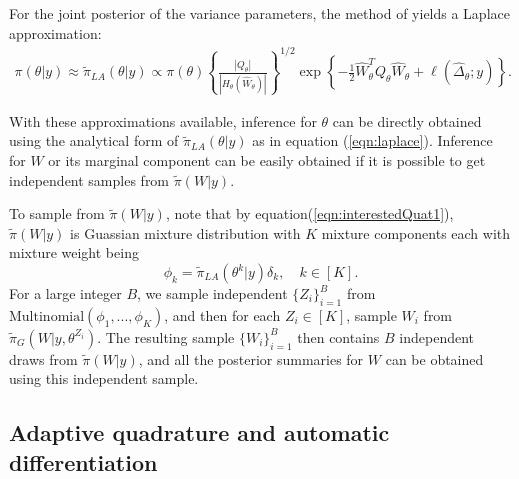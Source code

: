 \documentclass[ba]{imsart}
\begin{document}
For the joint posterior of the variance parameters, the method of \cite{tierney} yields a Laplace approximation:
\begin{equation}\begin{aligned}\label{eqn:laplace}
\pi(\theta|y) \approx \tilde{\pi}_{LA}(\theta|y) \propto \pi(\theta)\left\{\frac{\left|Q_{\theta}\right|}{\left|H_{\theta}\left(\widehat{W}_{\theta}\right)\right|}\right\}^{1/2}\exp\left\{ -\frac{1}{2}\widehat{W}_{\theta}^{T}Q_{\theta}\widehat{W}_{\theta} + \ell\left(\widehat{\Delta}_{\theta};y \right)\right\}.
\end{aligned}\end{equation}

With these approximations available, inference for $\theta$ can be directly obtained using the analytical form of $\tilde{\pi}_{LA}(\theta|y)$ as in equation (\ref{eqn:laplace}). Inference for $W$ or its marginal component can be easily obtained if it is possible to get independent samples from $\tilde{\pi}(W|y)$. 

To sample from $\tilde{\pi}(W|y)$, note that by equation(\ref{eqn:interestedQuat1}), $\tilde{\pi}(W|y)$ is Guassian mixture distribution with $K$ mixture components each with mixture weight being $$\phi_k = \tilde{\pi}_{LA}(\theta^{k}|y)\delta_{k},\quad k \in [K].$$
For a large integer $B$, we sample independent $\{Z_i\}_{i=1}^{B}$ from $\text{Multinomial}(\phi_1,...,\phi_K)$, and then for each $Z_i \in [K]$, sample $W_i$ from $\tilde{\pi}_{G}(W|y,\theta^{Z_i})$. The resulting sample $\{W_i\}_{i=1}^{B}$ then contains $B$ independent draws from $\tilde{\pi}(W|y)$, and all the posterior summaries for $W$ can be obtained using this independent sample.




\subsection{Adaptive quadrature and automatic differentiation}
\end{document}
